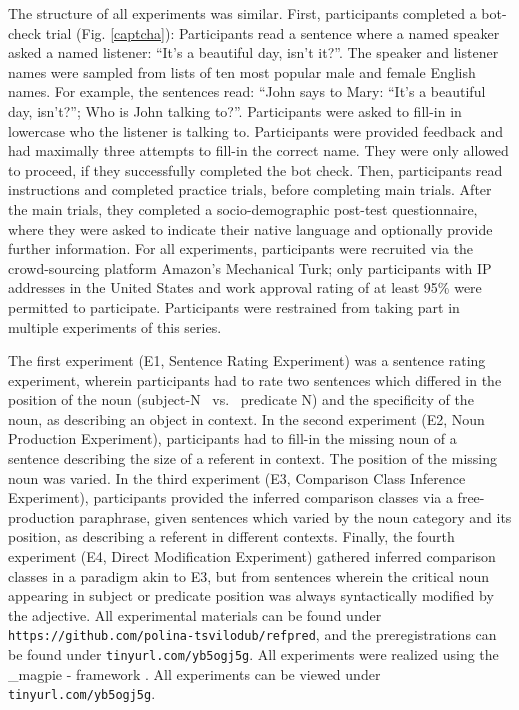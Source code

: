 The structure of all experiments was similar. First, participants completed a bot-check trial (Fig. \ref{captcha}): Participants read a sentence where a named speaker asked a named listener: “It’s a beautiful day, isn’t it?”. The speaker and listener names were sampled from lists of ten most popular male and female English names. For example, the sentences read: “John says to Mary: “It’s a beautiful day, isn’t?”; Who is John talking to?”.  Participants were asked to fill-in in lowercase who the listener is talking to. Participants were provided feedback and had maximally three attempts to fill-in the correct name. They were only allowed to proceed, if they successfully completed the bot check. Then, participants read instructions and completed practice trials, before completing main trials. After the main trials, they completed a socio-demographic post-test questionnaire, where they were asked to indicate their native language and optionally provide further information. 
For all experiments, participants were recruited via the crowd-sourcing platform Amazon’s Mechanical Turk; only participants with IP addresses in the United States and work approval rating of at least 95\% were permitted to participate. Participants were restrained from taking part in multiple experiments of this series.  

The first experiment (E1, Sentence Rating Experiment) was a sentence rating experiment, wherein participants had to rate two sentences which differed in the position of the noun (subject-N ~vs.~ predicate N) and the specificity of the noun, as describing an object in context. 
In the second experiment (E2, Noun Production Experiment), participants had to fill-in the missing noun of a sentence describing the size of a referent in context. The position of the missing noun was varied. 
In the third experiment (E3, Comparison Class Inference Experiment), participants provided the inferred comparison classes via a free-production paraphrase, given sentences which varied by the noun category and its position, as describing a referent in different contexts. 
Finally, the fourth experiment (E4, Direct Modification Experiment) gathered inferred comparison classes in a paradigm akin to E3, but from sentences wherein the critical noun appearing in subject or predicate position was always syntactically modified by the adjective. 
All experimental materials can be found under \texttt{https://github.com/polina-tsvilodub/refpred}, and  the preregistrations can be found under \texttt{tinyurl.com/yb5ogj5g}.  All experiments were realized using the \_magpie - framework \parencite{magpie}. 
All experiments can be viewed under \texttt{tinyurl.com/yb5ogj5g}. 

